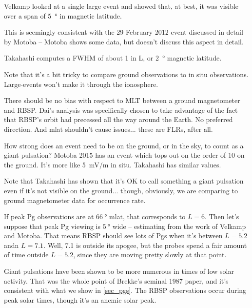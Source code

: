 
Velkamp\cite{veldkamp_1960} looked at a single large event and showed that, at best, it was visible over a span of \SI{5}{\degree} in magnetic latitude. 

This is seemingly consistent with the 29 February 2012 event discussed in detail by Motoba\cite{motoba_2015} -- Motoba shows some data, but doesn't discuss this aspect in detail. 

Takahashi\cite{takahashi_2011} computes a FWHM of about 1 in L, or \SI{2}{\degree} magnetic latitude. 


Note that it's a bit tricky to compare ground observations to in situ observations. Large-\azm events won't make it through the ionosphere. 

There should be no bias with respect to MLT between a ground magnetometer and RBSP. Dai's analysis was specifically chosen to take advantage of the fact that RBSP's orbit had precessed all the way around the Earth. No preferred direction. And mlat shouldn't cause issues... these are FLRs, after all. 

How strong does an event need to be on the ground, or in the sky, to count as a giant pulsation? Motoba 2015\cite{motoba_2015} has an event which tops out on the order of \SI{10}{\nT} on the ground. It's more like \SI{5}{\mV/\m} in situ. Takahashi\cite{takahashi_2011} has similar values. 

Note that Takahashi\cite{takahashi_2013} has shown that it's OK to call something a giant pulsation even if it's not visible on the ground... though, obviously, we are comparing to ground magnetometer data for occurrence rate. 

If peak Pg observations are at $\SI{66}{\degree}$ mlat, that corresponds to $L = 6$. Then let's suppose that peak Pg viewing is $\SI{5}{\degree}$ wide -- estimating from the work of Velkamp and Motoba. That means RBSP should see lots of Pgs when it's between $L = 5.2$ andn $L = 7.1$. Well, \SI{7.1}{\RE} is outside its apogee, but the probes spend a fair amount of time outside $L = 5.2$, since they are moving pretty slowly at that point. 

Giant pulsations have been shown to be more numerous in times of low solar activity. That was the whole point of Brekke's seminal 1987 paper, and it's consistent with what we show in \cref{sec_pgs}. The RBSP observations occur during peak solar times, though it's an anemic solar peak\cite{pesnell_2016}. 

